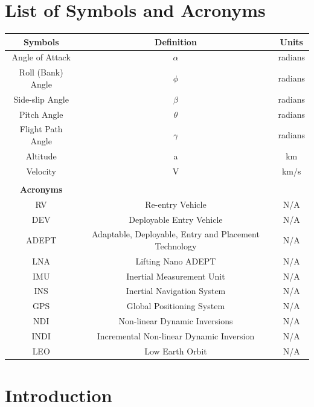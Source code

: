 \documentclass[12pt]{article}
\numberwithin{equation}{section}
\numberwithin{figure}{section}
\numberwithin{table}{section}
\begin{document}
\section*{List of Symbols and Acronyms}
\vfill
\begin{center}
\begin{tabular}{|c|c|c|}
\hline
\textbf{Symbols} & \textbf{Definition} & \textbf{Units} \\
\hline
Angle of Attack & $\alpha$ & radians\\
\hline
Roll (Bank) Angle & $\phi$ & radians\\
\hline
Side-slip Angle & $\beta$ & radians\\
\hline
Pitch Angle & $\theta$ & radians\\
\hline
Flight Path Angle & $\gamma$ & radians\\
\hline
Altitude & a & km\\
\hline
Velocity & V & km/s\\
\hline
& &\\
\hline
\textbf{Acronyms} & &\\
\hline
RV & Re-entry Vehicle & N/A\\
\hline
DEV & Deployable Entry Vehicle & N/A\\
\hline
ADEPT & Adaptable, Deployable, Entry and Placement Technology & N/A\\
\hline
LNA & Lifting Nano ADEPT & N/A\\
\hline
IMU & Inertial Measurement Unit & N/A\\
\hline
INS & Inertial Navigation System & N/A\\
\hline
GPS & Global Positioning System & N/A\\
\hline
NDI & Non-linear Dynamic Inversions & N/A\\
\hline
INDI & Incremental Non-linear Dynamic Inversion & N/A\\
\hline
LEO & Low Earth Orbit & N/A\\
\hline
\end{tabular}
\end{center}
\vfill

\newpage
\setcounter{page}{1}

\section{Introduction}
\end{document}
